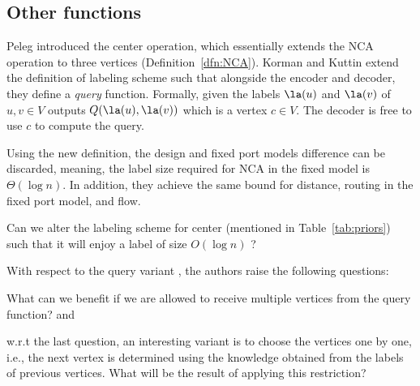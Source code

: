 	\subsection*{Other functions}
	Peleg introduced the center operation, which essentially extends the NCA operation to three vertices (Definition~\ref{dfn:NCA}).
	Korman and Kuttin  \cite{Korman07K} extend  the definition of labeling scheme such that alongside the encoder and decoder, they define a \emph{query} function.
	Formally, given the labels $\la(u)$ and  $\la(v)$  of $u,v  \in  V $  outputs $Q(\la(u), \la(v))$ which is a vertex $ c \in V$.
	The decoder is free to use $c$ to compute the query.
	
	Using the new definition, the design and fixed port models difference can be discarded, meaning, the label size required for NCA in the fixed  model is $\Theta(\log n)$.
	In addition, they achieve the same bound for distance, routing in the fixed port model, and flow.
	 

	
	\begin{open}
	Can we alter  the labeling scheme for center (mentioned in Table~\ref{tab:priors}) such that it will enjoy a label of size $O(\log n)$ \cite{Peleg05}?
	\end{open}
	
	\begin{open}
	With respect to the query variant \cite{Korman07K}, the authors raise the following questions:
			\begin{inparaenum}  
			\item What can we benefit if  we  are allowed to receive multiple vertices from the query function?
			 and 
			\item w.r.t the last question, an interesting variant is to choose the  vertices one by one, i.e., the next vertex is determined using the knowledge obtained from the labels of previous vertices. What will be the result of applying this restriction?
		\end{inparaenum}
	\end{open}



		
